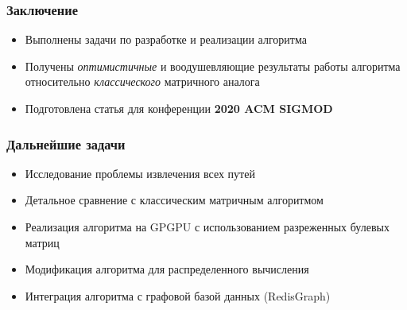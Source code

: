 \documentclass[xcolor=table,english,russian]{beamer}
\begin{document}
\begin{frame}[fragile] \frametitle{Заключение}
    \begin{itemize}
        \item Выполнены задачи по разработке и реализации алгоритма
        \item Получены \textit{оптимистичные} и воодушевляющие результаты работы алгоритма относительно \textit{классического} матричного аналога
        \item Подготовлена статья для конференции \textbf{2020 ACM SIGMOD} 
    \end{itemize}
\end{frame}

\begin{frame}[fragile] \frametitle{Дальнейшие задачи}
  \begin{itemize}
    \item Исследование проблемы извлечения всех путей
    \item Детальное сравнение с классическим матричным алгоритмом
    \item Реализация алгоритма на GPGPU с использованием разреженных булевых матриц
    \item Модификация алгоритма для распределенного вычисления 
    \item Интеграция алгоритма с графовой базой данных (RedisGraph)
\end{itemize}
\end{frame}
\end{document}
